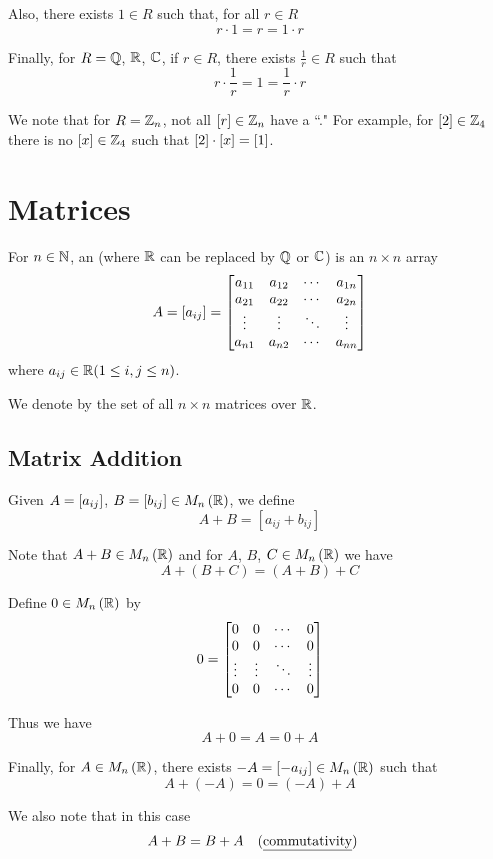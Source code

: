 Also, there exists $1 \in R$ such that, for all $r \in R$
$$r \cdot 1 = r = 1 \cdot r$$

Finally, for $R = \mathbb{Q}$, $\mathbb{R}$, $\mathbb{C}$, if $r \in R$, there exists
$\frac{1}{r} \in R$ such that
$$r \cdot \frac1r = 1 = \frac1r \cdot r$$

We note that for $R = \mathbb{Z}_n$, not all $\left[r\right] \in \mathbb{Z}_n$ have a
``."
For example, for $\left[2\right] \in \mathbb{Z}_4$ there is no $\left[x\right] \in \mathbb{Z}_4$
such that $\left[2\right]\cdot\left[x\right]=\left[1\right]$.


\section{Matrices}

For $n \in \mathbb{N}$, an  (where $\mathbb{R}$ can be
replaced by $\mathbb{Q}$ or $\mathbb{C}$) is an $n \times n$ array
$$A = \left[a_{ij}\right] = \begin{bmatrix}
  a_{11} & a_{12} & \cdots & a_{1n} \\
  a_{21} & a_{22} & \cdots & a_{2n} \\
  \vdots & \vdots & \ddots & \vdots \\
  a_{n1} & a_{n2} & \cdots & a_{nn}
\end{bmatrix}$$
where $a_{ij} \in \mathbb{R} (1 \le i,j \le n)$.

We denote by \keyword{$\Mn\R$} the set of all $n \times n$ matrices over $\mathbb{R}$.

\subsection{Matrix Addition}
Given $A = \left[a_{ij}\right]$, $B = \left[b_{ij}\right] \in M_{n}\left(\mathbb{R}\right)$, we define
$$A + B = [a_{ij} + b_{ij}]$$

Note that $A+B \in M_{n}\left(\mathbb{R}\right)$ and for $A$, $B$, $C \in M_{n}\left(\mathbb{R}\right)$ we have
$$A+(B+C) = (A+B)+C$$

Define $0 \in M_{n}\left(\mathbb{R}\right)$ by
$$0 = \begin{bmatrix}
  0 & 0 & \cdots & 0 \\
  0 & 0 & \cdots & 0 \\
  \vdots & \vdots & \ddots & \vdots \\
  0 & 0 & \cdots & 0
\end{bmatrix}$$

Thus we have
$$A+0=A=0+A$$

Finally, for $A \in M_{n}\left(\mathbb{R}\right)$, there exists $-A = \left[-a_{ij}\right] \in M_{n}\left(\mathbb{R}\right)$
such that
$$A + (-A) = 0 = (-A) + A$$

We also note that in this case
\begin{align*}
  & A+B = B+A & & \text{(\keyword{commutativity})}
\end{align*}


